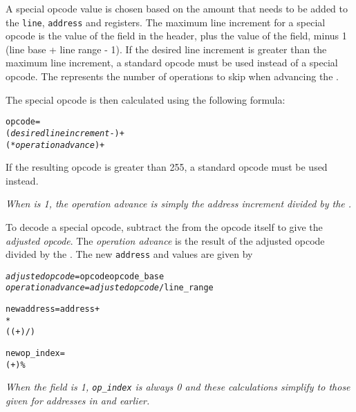 A special opcode value is chosen based on the amount that needs
to be added to the \texttt{line}, \texttt{address} and  registers.
The maximum line increment for a special opcode is the value
of the 
field in the header, plus the value of the 
 field, minus 1 (line base + 
line range - 1). 
If the desired line increment is greater than the maximum
line increment, a standard opcode must be used instead of a
special opcode. The  represents the number
of operations to skip when advancing the .

The special opcode is then calculated using the following formula:
\begin{alltt}
  opcode = 
    (\textit{desired line increment} - ) +
      ( * \textit{operation advance}) + 
\end{alltt}
If the resulting opcode is greater than 255, a standard opcode
must be used instead.

\textit{When  is 1, 
the operation advance is simply the address increment divided by the
.}

To decode a special opcode, subtract the  from
the opcode itself to give the \textit{adjusted opcode}. 
The \textit{operation advance} 
is the result of the adjusted opcode divided by the
. The new \texttt{address} and 
 values are given by
\begin{alltt}
  \textit{adjusted opcode} = opcode \dash opcode\_base
  \textit{operation advance} = \textit{adjusted opcode} / line\_range

  new address = address +
     *
      (( + ) / )

  new op\_index =
    ( + ) \% 
\end{alltt}

\textit{When the  
field is 1,
\texttt{op\_index} is always 0 and these calculations simplify to 
those given for addresses in \DWARFVersionIII{} and earlier.}

